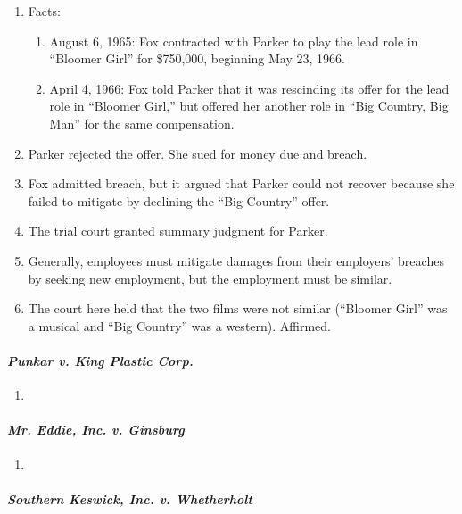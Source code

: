 \begin{enumerate}
    \item Facts:
    \begin{enumerate}
        \item August 6, 1965: Fox contracted with Parker to play the lead role 
        in ``Bloomer Girl'' for \$750,000, beginning May 23, 1966.
        \item April 4, 1966: Fox told Parker that it was rescinding its offer 
        for the lead role in ``Bloomer Girl,'' but offered her another role in 
        ``Big Country, Big Man'' for the same compensation.
    \end{enumerate}
    \item Parker rejected the offer. She sued for money due and breach.
    \item Fox admitted breach, but it argued that Parker could not recover 
    because she failed to mitigate by declining the ``Big Country'' offer.
    \item The trial court granted summary judgment for Parker.
    \item Generally, employees must mitigate damages from their employers' 
    breaches by seeking new employment, but the employment must be similar.
    \item The court here held that the two films were not similar (``Bloomer 
    Girl'' was a musical and ``Big Country'' was a western). Affirmed.
\end{enumerate}

\paragraph{\emph{Punkar v. King Plastic Corp.}}

\begin{enumerate}
    \item %
\end{enumerate}

\paragraph{\emph{Mr. Eddie, Inc. v. Ginsburg}}

\begin{enumerate}
    \item %
\end{enumerate}

\paragraph{\emph{Southern Keswick, Inc. v. Whetherholt}}

